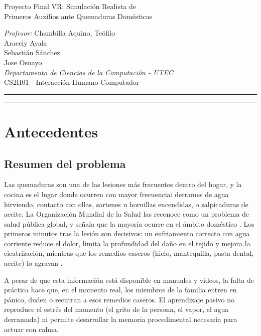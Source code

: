 \documentclass[11pt,letterpaper]{article}
\begin{document}
\begin{center}
  {\sffamily\LARGE Proyecto Final VR: Simulación Realista de\\[2pt]
  Primeros Auxilios ante Quemaduras Domésticas\par}
  \vspace{1.2em}
  {\sffamily\small
  \textit{Profesor:} Chambilla Aquino, Teófilo\\[6pt]
  Aracely Ayala \\
  Sebastián Sánchez \\
  Jose Osnayo \\[6pt]
  \textit{Departamento de Ciencias de la Computación - UTEC}\\
  CS2H01 - Interacción Humano-Computador\par}
  \vspace{0.8em}
  \rule[0.5ex]{3cm}{0.6pt}\quad{}\quad\rule[0.5ex]{3cm}{0.6pt}
\end{center}
\vspace{1em}

\section{Antecedentes}

\subsection{Resumen del problema}

Las quemaduras son una de las lesiones más frecuentes dentro del hogar, y la cocina es el lugar donde ocurren con mayor frecuencia: derrames de agua hirviendo, contacto con ollas, sartenes u hornillas encendidas, o salpicaduras de aceite. La Organización Mundial de la Salud las reconoce como un problema de salud pública global, y señala que la mayoría ocurre en el ámbito doméstico \cite{who}. Los primeros minutos tras la lesión son decisivos: un enfriamiento correcto con agua corriente reduce el dolor, limita la profundidad del daño en el tejido y mejora la cicatrización, mientras que los remedios caseros (hielo, mantequilla, pasta dental, aceite) lo agravan \cite{nhs,ifrc}.

A pesar de que esta información está disponible en manuales y videos, la falta de práctica hace que, en el momento real, los miembros de la familia entren en pánico, duden o recurran a esos remedios caseros. El aprendizaje pasivo no reproduce el estrés del momento (el grito de la persona, el vapor, el agua derramada) ni permite desarrollar la memoria procedimental necesaria para actuar con calma.
\end{document}
